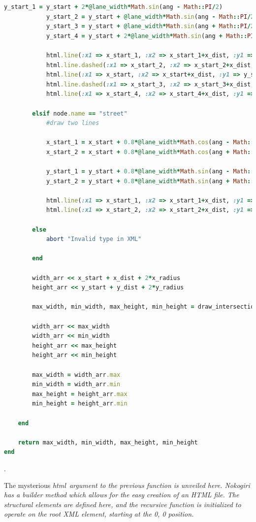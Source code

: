 \documentclass{article}
\begin{document}
\begin{lstlisting}[language=ruby]
			y_start_1 = y_start + 2*@lane_width*Math.sin(ang - Math::PI/2)
			y_start_2 = y_start + @lane_width*Math.sin(ang - Math::PI/2)
			y_start_3 = y_start + @lane_width*Math.sin(ang + Math::PI/2)
			y_start_4 = y_start + 2*@lane_width*Math.sin(ang + Math::PI/2)

			html.line(:x1 => x_start_1, :x2 => x_start_1+x_dist, :y1 => y_start_1, :y2 => y_start_1+y_dist)
			html.line.dashed(:x1 => x_start_2, :x2 => x_start_2+x_dist, :y1 => y_start_2, :y2 => y_start_2+y_dist)
			html.line(:x1 => x_start, :x2 => x_start+x_dist, :y1 => y_start, :y2 => y_start+y_dist)
			html.line.dashed(:x1 => x_start_3, :x2 => x_start_3+x_dist, :y1 => y_start_3, :y2 => y_start_3+y_dist)
			html.line(:x1 => x_start_4, :x2 => x_start_4+x_dist, :y1 => y_start_4, :y2 => y_start_4+y_dist)

		elsif node.name == "street"
			#draw two lines

			x_start_1 = x_start + 0.8*@lane_width*Math.cos(ang - Math::PI/2)
			x_start_2 = x_start + 0.8*@lane_width*Math.cos(ang + Math::PI/2)

			y_start_1 = y_start + 0.8*@lane_width*Math.sin(ang - Math::PI/2)
			y_start_2 = y_start + 0.8*@lane_width*Math.sin(ang + Math::PI/2)

			html.line(:x1 => x_start_1, :x2 => x_start_1+x_dist, :y1 => y_start_1, :y2 => y_start_1+y_dist)
			html.line(:x1 => x_start_2, :x2 => x_start_2+x_dist, :y1 => y_start_2, :y2 => y_start_2+y_dist)

		else
			abort "Invalid type in XML"
			
		end
			
		width_arr << x_start + x_dist + 2*x_radius
		height_arr << y_start + y_dist + 2*y_radius

		max_width, min_width, max_height, min_height = draw_intersection(node, html, x_start+x_dist, y_start+y_dist)

		width_arr << max_width
		width_arr << min_width
		height_arr << max_height
		height_arr << min_height
			
		max_width = width_arr.max
		min_width = width_arr.min
		max_height = height_arr.max
		min_height = height_arr.min
			
	end
			
	return max_width, min_width, max_height, min_height
end
\end{lstlisting}.

The mysterious \em{html}\em\ argument to the previous function is unveiled here. Nokogiri has a builder method which allows for the easy creation of an HTML file. The structural elements are defined here, and the recursive function is initialized to operate on the root XML element, starting at the 0, 0 position.\\
\end{document}
